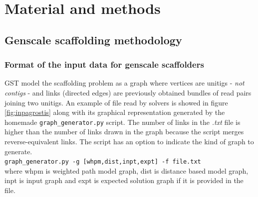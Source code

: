 \documentclass[12pt]{article}
\begin{document}

\newpage
\section{Material and methods} \label{sec:MatMet}
\subsection{Genscale scaffolding methodology}\label{sec:genscafmeth}
\subsubsection{Format of the input data for genscale scaffolders}
GST model the scaffolding problem as a graph where vertices are unitigs - \textit{not contigs} - and links (directed edges) are previously obtained bundles of read pairs joining two unitigs. An example of file read by solvers is showed in figure \ref{fig:inpagrostis} along with its graphical representation generated by the homemade \texttt{graph\_generator.py} script. The number of links in the \textit{.txt} file is higher than the number of links drawn in the graph because the script merges reverse-equivalent links. The script has an option to indicate the kind of graph to generate. \\
\texttt{graph\_generator.py -g [whpm,dist,inpt,expt] -f file.txt}\\ where whpm is weighted path model graph, dist is distance based model graph, inpt is input graph and expt is expected solution graph if it is provided in the file.
\end{document}
